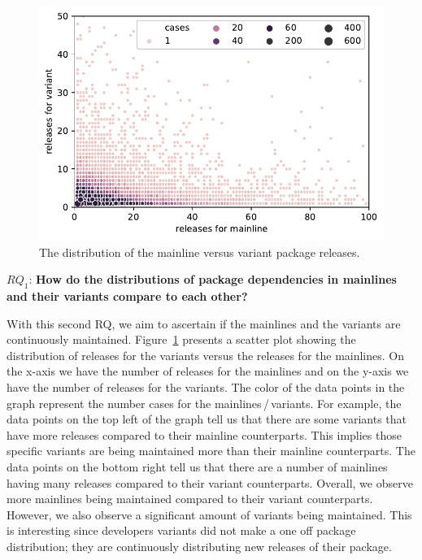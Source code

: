 \begin{figure}[htbp]
\vspace{-.3cm}
   \centering
    \includegraphics[scale=0.6]{figures/benevolj_releases.pdf}
    \caption{The distribution of the mainline versus variant package releases.}
    \label{fig:releases}
\end{figure}


$RQ_1$: \textbf{How do the distributions of package dependencies in mainlines and their variants compare to each other?}

With this second RQ, we aim to ascertain if the mainlines and the variants are continuously maintained. 
Figure~\ref{fig:releases} presents a scatter plot showing the distribution of releases for the variants versus the releases for the mainlines. 
On the x-axis we have the number of releases for the mainlines and on the y-axis we have the number of releases for the variants. 
The color of the data points in the graph represent the number cases for the mainlines\,/\,variants. 
For example, the data points on the top left of the graph tell us that there are some variants that have more releases compared to their mainline counterparts. 
This implies those specific variants are being maintained more than their mainline counterparts.
The data points on the bottom right tell us that there are a number of mainlines having many releases compared to their variant counterparts. 
Overall, we observe more mainlines being maintained compared to their variant counterparts.
However, we also observe a significant amount of variants being maintained. 
This is interesting since developers variants did not make a one off package distribution; they are continuously distributing new releases of their package. 

